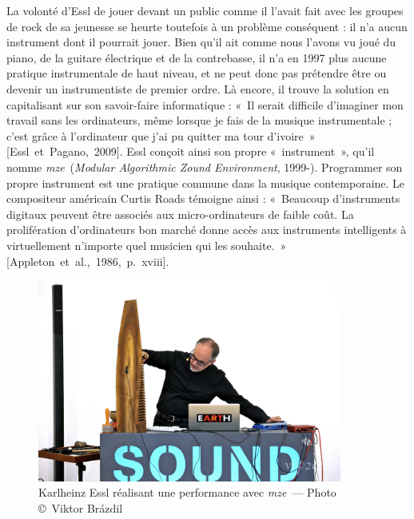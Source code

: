 \documentclass[a4paper,12pt]{article}
\newcommand{\guill}[1]{«~#1~»}
\newcommand{\maze}[0]{\emph{m\symbol{64}ze\textdegree2}}
\newcommand{\cicite}[1]{{\footnotesize[#1]}}
\begin{document}
La volonté d'Essl de jouer devant un public comme il l'avait fait avec les groupes de rock de sa jeunesse se heurte toutefois à un problème conséquent : il n'a aucun instrument dont il pourrait jouer. Bien qu'il ait comme nous l'avons vu joué du piano, de la guitare électrique et de la contrebasse, il n'a en 1997 plus aucune pratique instrumentale de haut niveau, et ne peut donc pas prétendre être ou devenir un instrumentiste de premier ordre. Là encore, il trouve la solution en capitalisant sur son savoir-faire informatique : \guill{Il serait difficile d'imaginer mon travail sans les ordinateurs, même lorsque je fais de la musique instrumentale ; c'est grâce à l'ordinateur que j'ai pu quitter ma tour d'ivoire} \cicite{Essl~et~Pagano,~2009}. Essl conçoit ainsi son propre \guill{instrument}, qu'il nomme \maze~(\emph{Modular Algorithmic Zound Environment}, 1999-). Programmer son propre instrument est une pratique commune dans la musique contemporaine. Le compositeur américain Curtis Roads témoigne ainsi : \guill{Beaucoup d'instruments digitaux peuvent être associés aux micro-ordinateurs de faible coût. La prolifération d'ordinateurs bon marché donne accès aux instruments intelligents à virtuellement n'importe quel musicien qui les souhaite.} \cicite{Appleton~et~al.,~1986,~p.~xviii}.

\begin{figure}[!h]
\begin{center}
\includegraphics[width=10cm]{images/performance.jpg}
\caption{\footnotesize Karlheinz Essl réalisant une performance avec \maze~--- Photo \copyright~Viktor Br\'azdil}
\label{performancephoto}
\end{center}
\end{figure}
\end{document}
